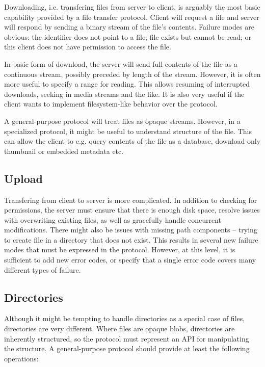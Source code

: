 Downloading, i.e. transfering files from server to client, is arguably the most basic capability provided by
a file transfer protocol. Client will request a file and server will respond by sending a binary stream of the
file's contents. Failure modes are obvious: the identifier does not point to a file; file exists but cannot be
read; or this client does not have permission to access the file.

In basic form of download, the server will send full contents of the file as a continuous stream, possibly
preceded by length of the stream. However, it is often more useful to specify a range for reading. This allows
resuming of interrupted downloads, seeking in media streams and the like. It is also very useful if the client
wants to implement filesystem-like behavior over the protocol.

A general-purpose protocol will treat files as opaque streams. However, in a specialized protocol, it might be
useful to understand structure of the file. This can allow the client to e.g. query contents of the file as
a database, download only thumbnail or embedded metadata etc.

\subsection{Upload}

Transfering from client to server is more complicated. In addition to checking for permissions, the server
must ensure that there is enough disk space, resolve issues with overwriting existing files, as well as
gracefully handle concurrent modifications. There might also be issues with missing path components -- trying
to create file in a directory that does not exist. This results in several new failure modes that must be
expressed in the protocol. However, at this level, it is sufficient to add new error codes, or specify that
a single error code covers many different types of failure.

\subsection{Directories}

Although it might be tempting to handle directories as a special case of files, directories are very
different. Where files are opaque blobs, directories are inherently structured, so the protocol must represent
an API for manipulating the structure. A general-purpose protocol should provide at least the following
operations:

